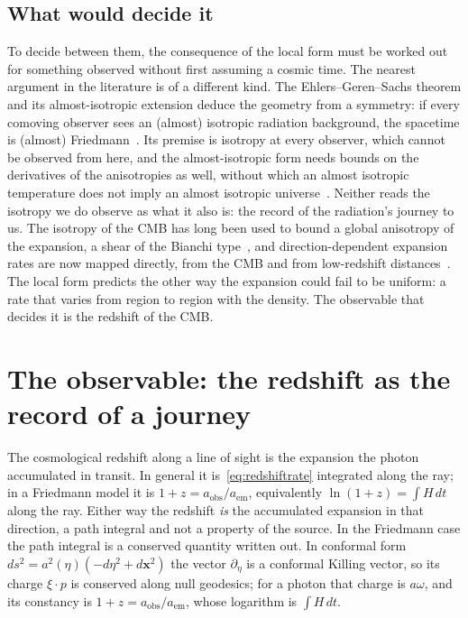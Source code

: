 \documentclass[twocolumn]{aastex701}
\begin{document}
\subsection{What would decide it}\label{sec:decide}

To decide between them, the consequence of the local form must be worked out for something observed without first assuming a cosmic time. The nearest argument in the literature is of a different kind. The Ehlers--Geren--Sachs theorem and its almost-isotropic extension deduce the geometry from a symmetry: if every comoving observer sees an (almost) isotropic radiation background, the spacetime is (almost) Friedmann~\citep{EGS1968, Stoeger1995}. Its premise is isotropy at every observer, which cannot be observed from here, and the almost-isotropic form needs bounds on the derivatives of the anisotropies as well, without which an almost isotropic temperature does not imply an almost isotropic universe~\citep{Nilsson1999}. Neither reads the isotropy we do observe as what it also is: the record of the radiation's journey to us. The isotropy of the CMB has long been used to bound a global anisotropy of the expansion, a shear of the Bianchi type~\citep{CollinsHawking1973, Saadeh2016}, and direction-dependent expansion rates are now mapped directly, from the CMB and from low-redshift distances~\citep{Zhou2025}. The local form predicts the other way the expansion could fail to be uniform: a rate that varies from region to region with the density. The observable that decides it is the redshift of the CMB.

\section{The observable: the redshift as the record of a journey}\label{sec:decomp}

The cosmological redshift along a line of sight is the expansion the photon accumulated in transit. In general it is~\eqref{eq:redshiftrate} integrated along the ray; in a Friedmann model it is $1+z = a_{\mathrm{obs}}/a_{\mathrm{em}}$, equivalently $\ln(1+z) = \int H\,dt$ along the ray. Either way the redshift \emph{is} the accumulated expansion in that direction, a path integral and not a property of the source. In the Friedmann case the path integral is a conserved quantity written out. In conformal form $ds^{2}=a^{2}(\eta)(-d\eta^{2}+d\mathbf{x}^{2})$ the vector $\partial_\eta$ is a conformal Killing vector, so its charge $\xi\!\cdot\!p$ is conserved along null geodesics; for a photon that charge is $a\omega$, and its constancy is $1+z=a_{\mathrm{obs}}/a_{\mathrm{em}}$, whose logarithm is $\int H\,dt$.
\end{document}
